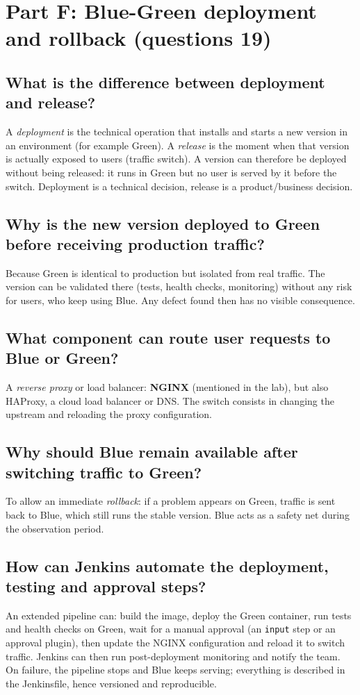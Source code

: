 \documentclass[11pt,a4paper]{article}
\begin{document}
\section{Part F: Blue-Green deployment and rollback (questions 19)}

\subsection{What is the difference between deployment and release?}
A \emph{deployment} is the technical operation that installs and starts a new version in
an environment (for example Green). A \emph{release} is the moment when that version is
actually exposed to users (traffic switch). A version can therefore be deployed without
being released: it runs in Green but no user is served by it before the switch. Deployment
is a technical decision, release is a product/business decision.

\subsection{Why is the new version deployed to Green before receiving production traffic?}
Because Green is identical to production but isolated from real traffic. The version can
be validated there (tests, health checks, monitoring) without any risk for users, who keep
using Blue. Any defect found then has no visible consequence.

\subsection{What component can route user requests to Blue or Green?}
A \emph{reverse proxy} or load balancer: \textbf{NGINX} (mentioned in the lab), but also
HAProxy, a cloud load balancer or DNS. The switch consists in changing the upstream and
reloading the proxy configuration.

\subsection{Why should Blue remain available after switching traffic to Green?}
To allow an immediate \emph{rollback}: if a problem appears on Green, traffic is sent
back to Blue, which still runs the stable version. Blue acts as a safety net during the
observation period.

\subsection{How can Jenkins automate the deployment, testing and approval steps?}
An extended pipeline can: build the image, deploy the Green container, run tests and
health checks on Green, wait for a manual approval (an \texttt{input} step or an approval
plugin), then update the NGINX configuration and reload it to switch traffic. Jenkins can
then run post-deployment monitoring and notify the team. On failure, the pipeline stops
and Blue keeps serving; everything is described in the Jenkinsfile, hence versioned and
reproducible.
\end{document}

